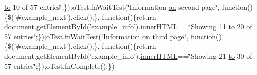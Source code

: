 \begin{DoxyCompactItemize}
\hyperlink{jquery-ui_8js_af6086621f45baa2cf538f19e45d3c263}{to} 10 of 57 entries\char`\"{};\});o\+Test.\+fn\+Wait\+Test(\char`\"{}Information \hyperlink{fullpage_2plugin_8min_8js_a1cfa98b7fed2aaf9fee3b68dbb7f9497}{on} second page\char`\"{}, function()\{\$('\#example\+\_\+next').click();\}, function()\{return document.\+get\+Element\+By\+Id('example\+\_\+info').\hyperlink{jquery-ui_8js_a87f73c4f0391c1cf9fe60374a76d9a7b}{inner\+H\+T\+M\+L}==\char`\"{}Showing 11 \hyperlink{jquery-ui_8js_af6086621f45baa2cf538f19e45d3c263}{to} 20 of 57 entries\char`\"{};\});o\+Test.\+fn\+Wait\+Test(\char`\"{}Information \hyperlink{fullpage_2plugin_8min_8js_a1cfa98b7fed2aaf9fee3b68dbb7f9497}{on} third page\char`\"{}, function()\{\$('\#example\+\_\+next').click();\}, function()\{return document.\+get\+Element\+By\+Id('example\+\_\+info').\hyperlink{jquery-ui_8js_a87f73c4f0391c1cf9fe60374a76d9a7b}{inner\+H\+T\+M\+L}==\char`\"{}Showing 21 \hyperlink{jquery-ui_8js_af6086621f45baa2cf538f19e45d3c263}{to} 30 of 57 entries\char`\"{};\});o\+Test.\+fn\+Complete();\})
\end{DoxyCompactItemize}


